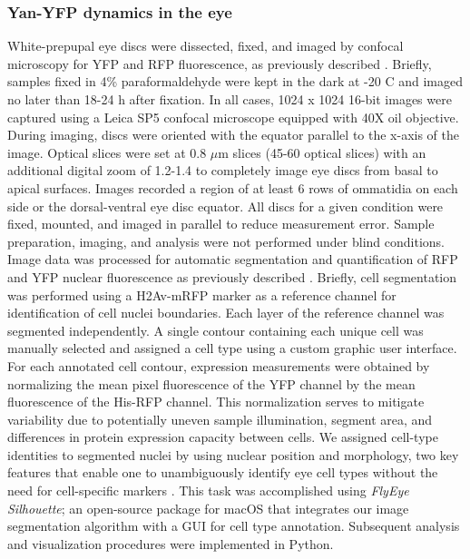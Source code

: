 \subsubsection{Yan-YFP dynamics in the eye}
\label{appendix:supp:metabolism:exp:yan}

White-prepupal eye discs were dissected, fixed, and imaged by confocal microscopy for YFP and RFP fluorescence, as previously described \cite{Pelaez2015}. Briefly, samples fixed in 4\% paraformaldehyde were kept in the dark at -20 \textdegree{}C and imaged no later than 18-24 h after fixation. In all cases, 1024 x 1024 16-bit images were captured using a Leica SP5 confocal microscope equipped with 40X oil objective. During imaging, discs were oriented with the equator parallel to the x-axis of the image. Optical slices were set at 0.8 $\mu$m slices (45-60 optical slices) with an additional digital zoom of 1.2-1.4 to completely image eye discs from basal to apical surfaces. Images recorded a region of at least 6 rows of ommatidia on each side or the dorsal-ventral eye disc equator. All discs for a given condition were fixed, mounted, and imaged in parallel to reduce measurement error. Sample preparation, imaging, and analysis were not performed under blind conditions. Image data was processed for automatic segmentation and quantification of RFP and YFP nuclear fluorescence as previously described \cite{Pelaez2015}. Briefly, cell segmentation was performed using a H2Av-mRFP marker as a reference channel for identification of cell nuclei boundaries. Each layer of the reference channel was segmented independently. A single contour containing each unique cell was manually selected and assigned a cell type using a custom graphic user interface. For each annotated cell contour, expression measurements were obtained by normalizing the mean pixel fluorescence of the YFP channel by the mean fluorescence of the His-RFP channel. This normalization serves to mitigate variability due to potentially uneven sample illumination, segment area, and differences in protein expression capacity between cells. We assigned cell-type identities to segmented nuclei by using nuclear position and morphology, two key features that enable one to unambiguously identify eye cell types without the need for cell-specific markers \cite{Wolff1993}. This task was accomplished using \textit{FlyEye Silhouette}; an open-source package for macOS that integrates our image segmentation algorithm with a GUI for cell type annotation. Subsequent analysis and visualization procedures were implemented in Python.

